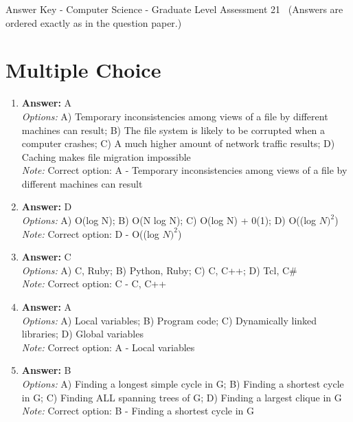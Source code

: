 \documentclass[12pt]{article}
\begin{document}
\begin{center}
Answer Key - Computer Science - Graduate Level Assessment 21 \
\small (Answers are ordered exactly as in the question paper.)
\end{center}

\section*{Multiple Choice}
\begin{enumerate}[label=\arabic*.]
\item \textbf{Answer:} A
\\ \textit{Options:} A) Temporary inconsistencies among views of a file by different machines can result; B) The file system is likely to be corrupted when a computer crashes; C) A much higher amount of network traffic results; D) Caching makes file migration impossible
\\ \textit{Note:} Correct option: A - Temporary inconsistencies among views of a file by different machines can result
\item \textbf{Answer:} D
\\ \textit{Options:} A) O(log N); B) O(N log N); C) O(log N) + 0(1); D) O((log $N)^2$)
\\ \textit{Note:} Correct option: D - O((log $N)^2$)
\item \textbf{Answer:} C
\\ \textit{Options:} A) C, Ruby; B) Python, Ruby; C) C, C++; D) Tcl, C\#
\\ \textit{Note:} Correct option: C - C, C++
\item \textbf{Answer:} A
\\ \textit{Options:} A) Local variables; B) Program code; C) Dynamically linked libraries; D) Global variables
\\ \textit{Note:} Correct option: A - Local variables
\item \textbf{Answer:} B
\\ \textit{Options:} A) Finding a longest simple cycle in G; B) Finding a shortest cycle in G; C) Finding ALL spanning trees of G; D) Finding a largest clique in G
\\ \textit{Note:} Correct option: B - Finding a shortest cycle in G
\end{enumerate}
\end{document}
